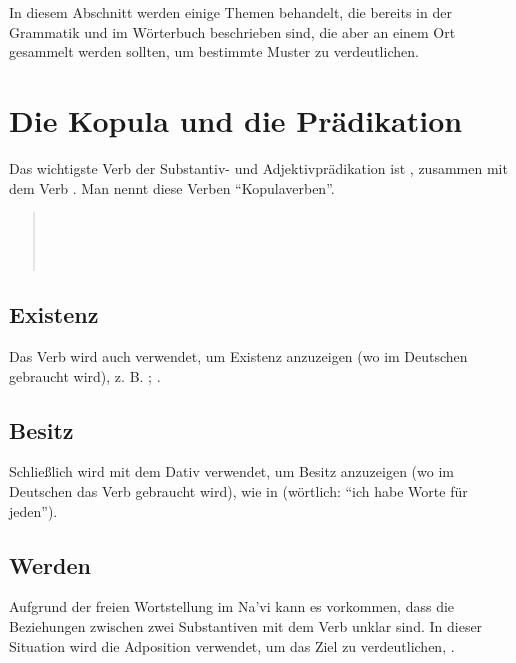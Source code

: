 
In diesem Abschnitt werden einige Themen behandelt, die bereits in der Grammatik und im Wörterbuch beschrieben sind, die aber an einem Ort gesammelt werden sollten, um bestimmte Muster zu verdeutlichen.

\section{Die Kopula und die Prädikation} 
Das wichtigste Verb der Substantiv- und Adjektivprädikation ist  , zusammen mit dem Verb  . Man nennt diese Verben ``Kopulaverben''.

\begin{quotation}
\noindent{}  \\
\noindent{}  \\
\noindent{}  \\
\noindent{} 
\end{quotation}

\subsection{Existenz}
Das Verb  wird auch verwendet, um Existenz anzuzeigen (wo im Deutschen  gebraucht wird), z. B.  ;  .

\subsection{Besitz}
Schließlich wird  mit dem Dativ verwendet, um Besitz anzuzeigen (wo im Deutschen das Verb  gebraucht wird), wie in   (wörtlich: ``ich habe Worte für jeden'').

\subsection{Werden}
Aufgrund der freien Wortstellung im Na'vi kann es vorkommen, dass die Beziehungen zwischen zwei Substantiven mit dem Verb   unklar sind. In dieser Situation wird die Adposition  verwendet, um das Ziel zu verdeutlichen,  .


